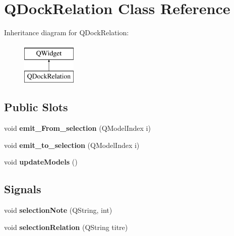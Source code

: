 \hypertarget{class_q_dock_relation}{}\section{Q\+Dock\+Relation Class Reference}
\label{class_q_dock_relation}
Inheritance diagram for Q\+Dock\+Relation\+:\begin{figure}[H]
\begin{center}
\leavevmode
\includegraphics[height=2.000000cm]{class_q_dock_relation}
\end{center}
\end{figure}
\subsection*{Public Slots}
\begin{DoxyCompactItemize}
\item 
\mbox{\label{class_q_dock_relation_a6072a6081826939baded79153ecbf341}} 
void {\bfseries emit\+\_\+\+From\+\_\+selection} (Q\+Model\+Index i)
\item 
\mbox{\label{class_q_dock_relation_aeb73f1a25957fb93815d3a47e1eed931}} 
void {\bfseries emit\+\_\+to\+\_\+selection} (Q\+Model\+Index i)
\item 
\mbox{\label{class_q_dock_relation_a3d3bd086c56c255eca9e0991359f0f84}} 
void {\bfseries update\+Models} ()
\end{DoxyCompactItemize}
\subsection*{Signals}
\begin{DoxyCompactItemize}
\item 
\mbox{\label{class_q_dock_relation_a8e6f45fa1d280057fba260274385b8b1}} 
void {\bfseries selection\+Note} (Q\+String, int)
\item 
\mbox{\label{class_q_dock_relation_a00c9f94b747cb5e552db374bf9c1781c}} 
void {\bfseries selection\+Relation} (Q\+String titre)
\end{DoxyCompactItemize}
